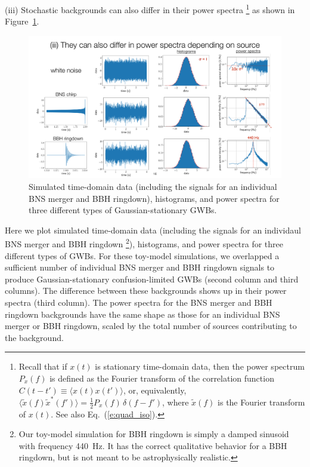 \documentclass[11pt]{article}
\numberwithin{equation}{section}
\begin{document}
(iii) Stochastic backgrounds can also differ in their power 
spectra%
\footnote{Recall that if $x(t)$ is stationary time-domain data, 
then the power spectrum $P_x(f)$ is defined as the Fourier 
transform of the correlation function 
$C(t-t') \equiv \langle x(t)x(t')\rangle$, or,
equivalently, $\langle \tilde x(f)\tilde x^*(f')\rangle =
\frac{1}{2}P_x(f)\,\delta(f-f')$, where $\tilde x(f)$ is the Fourier
transform of $x(t)$.
See also Eq.~(\ref{e:quad_iso}).}
as shown in Figure~\ref{f:different_power_spectra}.
%
\begin{figure}[htbp!]
\begin{center}
\includegraphics[width=\textwidth]{Figures/different_power_spectra}
\caption{Simulated time-domain data (including the signals for an
individual BNS merger and BBH ringdown), histograms, and power spectra
for three different types of Gaussian-stationary GWBs.}
\label{f:different_power_spectra}
\end{center}
\end{figure}
%
Here we plot simulated time-domain data (including the signals for an
individaul BNS merger and BBH ringdown%
\footnote{Our toy-model simulation for BBH ringdown is simply a 
damped sinusoid with frequency 440~Hz.
It has the correct qualitative behavior for a BBH ringdown, but 
is not meant to be astrophysically realistic.}), 
histograms, and power spectra
for three different types of GWBs.
For these toy-model simulations, we overlapped a sufficient number of 
individual BNS merger and BBH ringdown signals to produce 
Gaussian-stationary confusion-limited GWBs
(second column and third columns).
The difference between these backgrounds shows up in their power 
spectra (third column).
The power spectra for the BNS merger and BBH ringdown backgrounds 
have the same shape as those for an individual BNS merger or 
BBH ringdown, scaled by the total number of sources contributing 
to the background.
\end{document}

